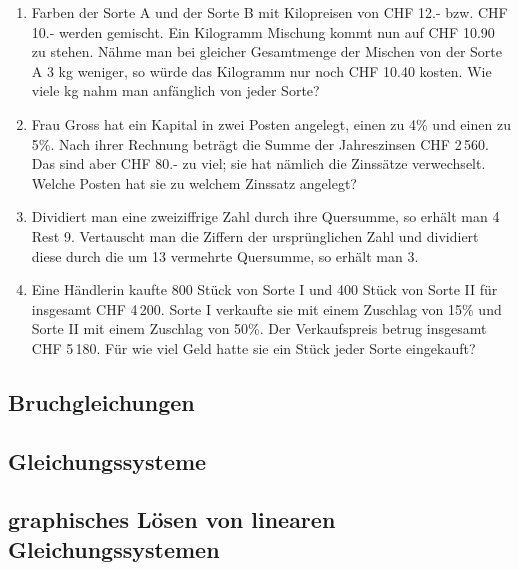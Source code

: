  \begin{enumerate}
  \item
    Farben der Sorte A und der Sorte B mit Kilopreisen von CHF 12.-
    bzw. CHF 10.- werden gemischt. Ein Kilogramm Mischung kommt nun
    auf CHF 10.90 zu stehen. Nähme man bei gleicher Gesamtmenge der
    Mischen von der Sorte A 3 kg weniger, so würde das Kilogramm nur
    noch CHF 10.40 kosten. Wie viele kg nahm man anfänglich von jeder
    Sorte?

    \item Frau Gross hat ein Kapital in zwei Posten angelegt, einen zu
      4\% und einen zu 5\%. Nach ihrer Rechnung beträgt die Summe der
      Jahreszinsen CHF 2\,560. Das sind aber CHF 80.- zu viel; sie hat
      nämlich die Zinssätze verwechselt. Welche Posten hat sie zu
      welchem Zinssatz angelegt?

      \item Dividiert man eine zweiziffrige Zahl durch ihre Quersumme,
        so erhält man 4 Rest 9. Vertauscht man die Ziffern der
        ursprünglichen Zahl und dividiert diese durch die um 13
        vermehrte Quersumme, so erhält man 3.


        \item Eine Händlerin kaufte 800 Stück von Sorte I und 400
          Stück von Sorte II für insgesamt CHF 4\,200. Sorte I
          verkaufte sie mit einem Zuschlag von 15\% und Sorte II mit
          einem Zuschlag von 50\%. Der Verkaufspreis betrug insgesamt
          CHF 5\,180. Für wie viel Geld hatte sie ein Stück jeder
          Sorte eingekauft?
          
    \end{enumerate}


\subsection{Bruchgleichungen}

\subsection{Gleichungssysteme}





  \subsection{graphisches Lösen von linearen Gleichungssystemen}

